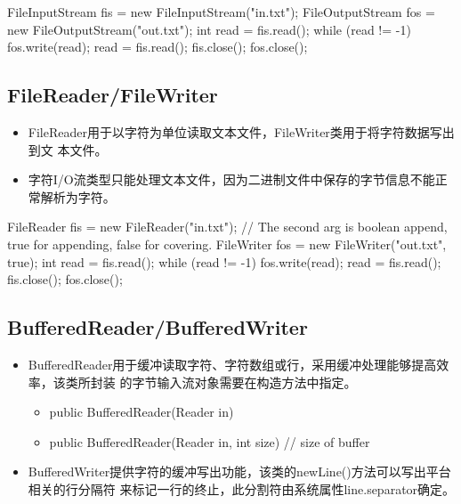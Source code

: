 
\begin{javaCode}
  FileInputStream fis = new FileInputStream("in.txt");
  FileOutputStream fos = new FileOutputStream("out.txt");
  int read = fis.read();
  while (read != -1) {
    fos.write(read);
    read = fis.read();
  } 
  fis.close();
  fos.close();
\end{javaCode}

\subsection{FileReader/FileWriter}

\begin{itemize}
\item FileReader用于以{\hei 字符}为单位读取文本文件，FileWriter类用于将字符数据写出到文
  本文件。
\item 字符I/O流类型只能处理文本文件，因为二进制文件中保存的字节信息不能正常解析为字符。
\end{itemize}


\begin{javaCode}
  FileReader fis = new FileReader("in.txt");
  // The second arg is boolean append, true for appending, false for covering.
  FileWriter fos = new FileWriter("out.txt", true); 
  int read = fis.read();
  while (read != -1) {
    fos.write(read);
    read = fis.read();
  } 
  fis.close();
  fos.close();
\end{javaCode}

\subsection{BufferedReader/BufferedWriter}

\begin{itemize}
\item BufferedReader用于缓冲读取字符、字符数组或行，采用缓冲处理能够提高效率，该类所封装
  的字节输入流对象需要在构造方法中指定。
  
  \begin{itemize}
  \item public BufferedReader(Reader in)
  \item public BufferedReader(Reader in, int size) // size of buffer
  \end{itemize}
\item BufferedWriter提供字符的缓冲写出功能，该类的newLine()方法可以写出平台相关的行分隔符
  来标记一行的终止，此分割符由系统属性line.separator确定。
\end{itemize}

